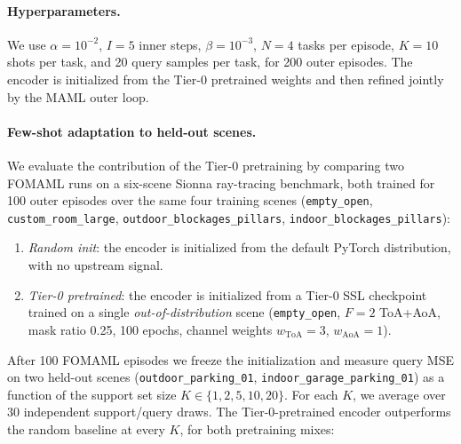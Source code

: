 \paragraph{Hyperparameters.}
We use $\alpha = 10^{-2}$, $I = 5$ inner steps, $\beta = 10^{-3}$,
$N = 4$ tasks per episode, $K = 10$ shots per task, and 20 query
samples per task, for 200 outer episodes. The encoder is
initialized from the Tier-0 pretrained weights and then refined
jointly by the MAML outer loop.

\paragraph{Few-shot adaptation to held-out scenes.}
We evaluate the contribution of the Tier-0 pretraining by
comparing two FOMAML runs on a six-scene Sionna ray-tracing
benchmark, both trained for 100 outer episodes over the same
four training scenes (\texttt{empty\_open},
\texttt{custom\_room\_large},
\texttt{outdoor\_blockages\_pillars},
\texttt{indoor\_blockages\_pillars}):
\begin{enumerate}
  \item \emph{Random init}: the encoder is initialized from the
    default PyTorch distribution, with no upstream signal.
  \item \emph{Tier-0 pretrained}: the encoder is initialized from
    a Tier-0 SSL checkpoint trained on a single
    \emph{out-of-distribution} scene (\texttt{empty\_open}, $F=2$
    ToA+AoA, mask ratio 0.25, 100 epochs, channel weights
    $w_{\mathrm{ToA}}{=}3$, $w_{\mathrm{AoA}}{=}1$).
\end{enumerate}
After 100 FOMAML episodes we freeze the initialization and
measure query MSE on two held-out scenes
(\texttt{outdoor\_parking\_01},
\texttt{indoor\_garage\_parking\_01}) as a function of the
support set size $K \in \{1, 2, 5, 10, 20\}$. For each $K$, we
average over 30 independent support/query draws. The
Tier-0-pretrained encoder outperforms the random baseline at
every $K$, for both pretraining mixes:
